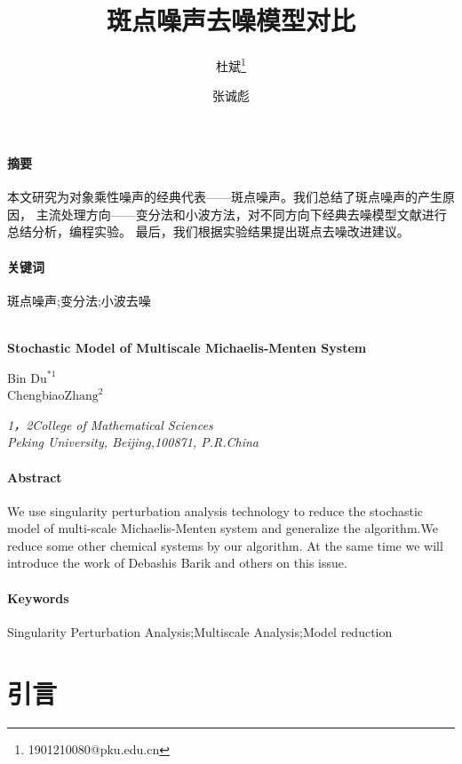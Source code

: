 \documentclass[UTF8]{ctexart}
\begin{document}
	\title{斑点噪声去噪模型对比}
	\author[1]{杜斌\thanks{1901210080@pku.edu.cn}}
	\author[2]{张诚彪}
	\date{}
	\maketitle
	\paragraph{摘要}
	本文研究为对象乘性噪声的经典代表——斑点噪声。我们总结了斑点噪声的产生原因，
	主流处理方向——变分法和小波方法，对不同方向下经典去噪模型文献进行总结分析，编程实验。
	最后，我们根据实验结果提出斑点去噪改进建议。
	\paragraph{关键词}斑点噪声;\quad 变分法;\quad	小波去噪
	\\ \hspace*{\fill} \\
	\clearpage
	\par \begin{center}
		\textbf{Stochastic Model of Multiscale Michaelis-Menten System}\\
		\begin{spacing}{2.0}
			Bin\; $\text{Du}^{\ast 1}$\\
			Chengbiao\;$\text{Zhang}^{2}$
		\end{spacing}
		\emph{1，2\;College of Mathematical Sciences}\\
		\emph{Peking University, Beijing,100871, P.R.China}\\
	\end{center}
	\paragraph{Abstract}We use singularity perturbation analysis technology to reduce the stochastic model of multi-scale Michaelis-Menten system  and generalize the algorithm.We reduce some other chemical systems by our algorithm. At the same time we will introduce the work of Debashis Barik and others on this issue.
	\hspace*{\fill} 
	\paragraph{Keywords}Singularity Perturbation Analysis;\quad Multiscale Analysis;\quad Model reduction
	\clearpage
	\tableofcontents
	\clearpage
	\section{引言}
	
\end{document}

